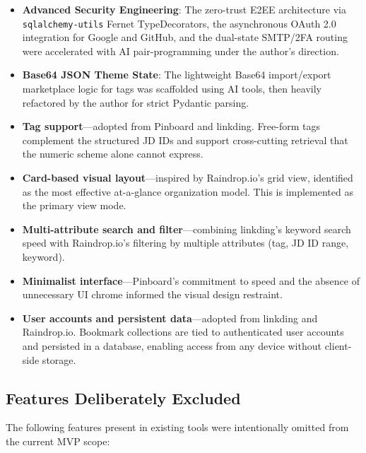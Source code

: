 \documentclass[11pt,a4paper]{book}
\begin{document}
\begin{itemize}
  \item \textbf{Advanced Security Engineering}: The zero-trust E2EE architecture via \texttt{sqlalchemy-utils} Fernet TypeDecorators, the asynchronous OAuth 2.0 integration for Google and GitHub, and the dual-state SMTP/2FA routing were accelerated with AI pair-programming under the author's direction.
  \item \textbf{Base64 JSON Theme State}: The lightweight Base64 import/export marketplace logic for tags was scaffolded using AI tools, then heavily refactored by the author for strict Pydantic parsing.

  \item \textbf{Tag support}---adopted from Pinboard and linkding. Free-form tags complement the structured JD IDs and support cross-cutting retrieval that the numeric scheme alone cannot express.
  \item \textbf{Card-based visual layout}---inspired by Raindrop.io's grid view, identified as the most effective at-a-glance organization model. This is implemented as the primary view mode.
  \item \textbf{Multi-attribute search and filter}---combining linkding's keyword search speed with Raindrop.io's filtering by multiple attributes (tag, JD ID range, keyword).
  \item \textbf{Minimalist interface}---Pinboard's commitment to speed and the absence of unnecessary UI chrome informed the visual design restraint.
  \item \textbf{User accounts and persistent data}---adopted from linkding and Raindrop.io. Bookmark collections are tied to authenticated user accounts and persisted in a database, enabling access from any device without client-side storage.
\end{itemize}

\subsection{Features Deliberately Excluded}

The following features present in existing tools were intentionally omitted from the current MVP scope:
\end{document}
